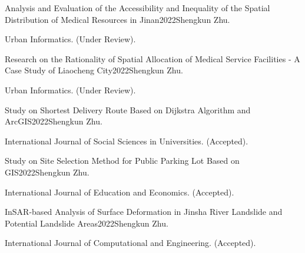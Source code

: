 \documentclass{joel_cv}
\begin{document}
\begin{enumerate}[label={[\arabic*]}]\setlength{\labelsep}{0.5em}\setlength{\itemindent}{0em}%
	

		\item \begin{sectionContentNormal}{Analysis and Evaluation of the Accessibility and Inequality of the Spatial Distribution of Medical Resources in Jinan}{2022}{Shengkun Zhu.}
		\item Urban Informatics. (Under Review).
	\end{sectionContentNormal}

		\item \begin{sectionContentNormal}{Research on the Rationality of Spatial Allocation of Medical Service Facilities - A Case Study of Liaocheng City}{2022}{Shengkun Zhu.}
	\item Urban Informatics. (Under Review).%
\end{sectionContentNormal}
	
	\item \begin{sectionContentNormal}{Study on Shortest Delivery Route Based on Dijkstra Algorithm and ArcGIS}{2022}{Shengkun Zhu.}
		\item International Journal of Social Sciences in Universities. (Accepted). 
	\end{sectionContentNormal}
	
	\item \begin{sectionContentNormal}{Study on Site Selection Method for Public Parking Lot Based on GIS}{2022}{Shengkun Zhu.}
		\item International Journal of Education and Economics. (Accepted). 
	\end{sectionContentNormal}
	
	\item \begin{sectionContentNormal}{InSAR-based Analysis of Surface Deformation in Jinsha River Landslide and Potential Landslide Areas}{2022}{Shengkun Zhu.}
	\item International Journal of Computational and Engineering. (Accepted). 
\end{sectionContentNormal}	
	

\end{enumerate}
\end{document}
